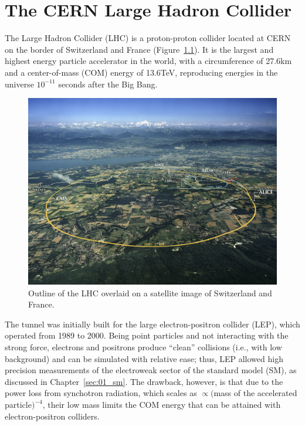 \chapter{The CERN Large Hadron Collider}
\label{sec:02_lhc}

The Large Hadron Collider (LHC) is a proton-proton collider located at CERN on the border of Switzerland and France (Figure~\ref{fig:02_lhc_geneva}).
It is the largest and highest energy particle accelerator in the world, with a circumference of 27.6\unit{km} and a center-of-mass (COM) energy of 13.6\unit{TeV}, reproducing energies in the universe $10^{-11}$ seconds after the Big Bang.

\begin{figure}[ht]
    \centering
    \includegraphics[width=\textwidth]{figures/02-CMS/lhc/lhc_geneva.jpg}
    \caption{Outline of the LHC overlaid on a satellite image of Switzerland and France.}
    \label{fig:02_lhc_geneva}
\end{figure}

The tunnel was initially built for the large electron-positron collider (LEP), which operated from 1989 to 2000.
Being point particles and not interacting with the strong force, electrons and positrons produce ``clean'' collisions (i.e., with low background) and can be simulated with relative ease; thus, LEP allowed high precision measurements of the electroweak sector of the standard model (SM), as discussed in Chapter~\ref{sec:01_sm}.
The drawback, however, is that due to the power loss from synchotron radiation, which scales as $\propto ($mass of the accelerated particle$)^{-4}$, their low mass limits the COM energy that can be attained with electron-positron colliders.

